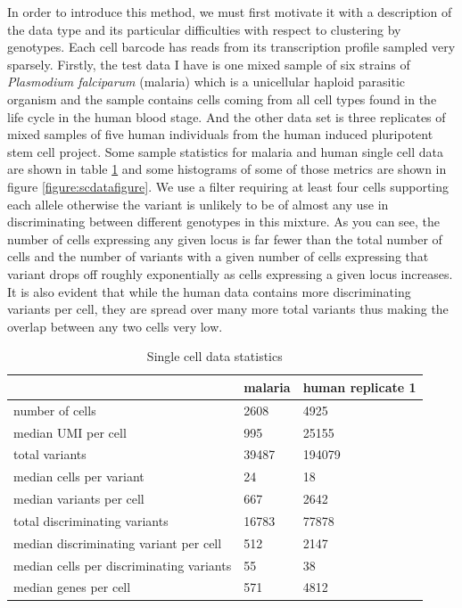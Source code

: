 In order to introduce this method, we must first motivate it with a description of the data type and its particular difficulties with respect to clustering by genotypes. Each cell barcode has reads from its transcription profile sampled very sparsely. Firstly, the test data I have is one mixed sample of six strains of \textit{Plasmodium falciparum} (malaria) which is a unicellular haploid parasitic organism and the sample contains cells coming from all cell types found in the life cycle in the human blood stage. And the other data set is three replicates of mixed samples 
of five human individuals from the human induced pluripotent stem cell project. Some sample statistics for malaria 
and human single cell data are shown in table \ref{table:scdatatable} and some histograms of some of those metrics are shown in figure \ref{figure:scdatafigure}. We use a filter 
requiring at least four cells supporting each allele otherwise the variant is unlikely to be of almost any use in discriminating between different genotypes in this mixture. 
As you can see, the number of cells expressing any given locus is far fewer than the total number of cells and the number of variants with a given number of cells expressing that variant drops off roughly exponentially as cells expressing a given locus increases. It is also evident that while the human data contains more discriminating variants per cell, they are spread over many more total variants thus making the overlap between any two cells very low.

\begin{table}[h!]
\caption{Single cell data statistics}
\label{table:scdatatable}
\begin{center}
\begin{tabular}{ | l | l | l | } 
 \hline
  & malaria & human replicate 1 \\ 
  \hline
  number of cells & 2608 & 4925  \\
 \hline
  median UMI per cell & 995 & 25155  \\ 
 \hline
 total variants & 39487 & 194079 \\
 \hline
 median cells per variant & 24 & 18 \\
 \hline
 median variants per cell & 667 & 2642  \\ 
 \hline
 total discriminating variants & 16783 & 77878 \\
  \hline
 median discriminating variant per cell & 512 & 2147 \\
 \hline
 median cells per discriminating variants & 55 & 38 \\
 \hline
 median genes per cell & 571 & 4812 \\
 \hline
 
\end{tabular}
\end{center}
\end{table}

